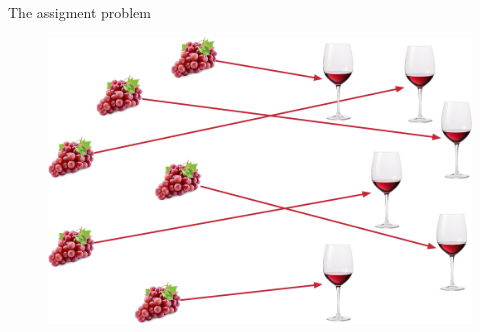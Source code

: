 \documentclass[pdf,aspectratio=169,10pt]{beamer}
\begin{document}
{
\begin{frame}[plain]
\end{frame}
}



\begin{frame}{The assigment problem}
    \begin{figure}
        \includegraphics[height=0.7\textheight]{../img/wine_assignment.pdf}  
    \end{figure}
\end{frame}
\end{document}
